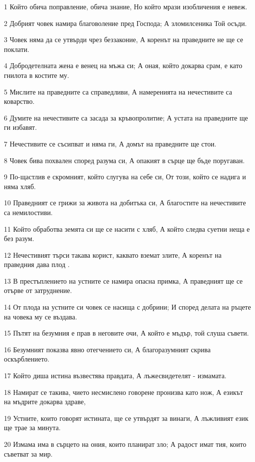 \par 1 Който обича поправление, обича знание, Но който мрази изобличения е невеж.
\par 2 Добрият човек намира благоволение пред Господа; А зломилсеника Той осъди.
\par 3 Човек няма да се утвърди чрез беззаконие, А коренът на праведните не ще се поклати.
\par 4 Добродетелната жена е венец на мъжа си; А оная, който докарва срам, е като гнилота в костите му.
\par 5 Мислите на праведните са справедливи, А намеренията на нечестивите са коварство.
\par 6 Думите на нечестивите са засада за кръвопролитие; А устата на праведните ще ги избавят.
\par 7 Нечестивите се съсипват и няма ги, А домът на праведните ще стои.
\par 8 Човек бива похвален според разума си, А опакият в сърце ще бъде поругаван.
\par 9 По-щастлив е скромният, който слугува на себе си, От този, който се надига и няма хляб.
\par 10 Праведният се грижи за живота на добитъка си, А благостите на нечестивите са немилостиви.
\par 11 Който обработва земята си ще се насити с хляб, А който следва суетни неща е без разум.
\par 12 Нечестивият търси такава корист, каквато вземат злите, А коренът на праведния дава плод .
\par 13 В престъплението на устните се намира опасна примка, А праведният ще се отърве от затруднение.
\par 14 От плода на устните си човек се насища с добрини; И според делата на ръцете на човека му се въздава.
\par 15 Пътят на безумния е прав в неговите очи, А който е мъдър, той слуша съвети.
\par 16 Безумният показва явно отегчението си, А благоразумният скрива оскърблението.
\par 17 Който диша истина възвестява правдата, А лъжесвидетелят - измамата.
\par 18 Намират се такива, чието несмислено говорене пронизва като нож, А езикът на мъдрите докарва здраве,
\par 19 Устните, които говорят истината, ще се утвърдят за винаги, А лъжливият език ще трае за минута.
\par 20 Измама има в сърцето на ония, които планират зло; А радост имат тия, които съветват за мир.
